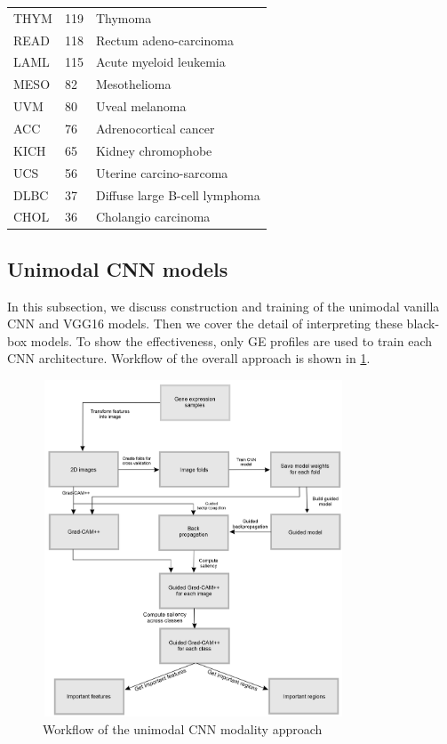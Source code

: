 \begin{table} [!ht]
\begin{center}
\begin{tabular}{l|l|l}
         THYM & 119  & Thymoma	 \\%
         READ & 118  & Rectum adeno-carcinoma \\%
         LAML & 115  & Acute myeloid leukemia	\\%
         MESO & 82  & Mesothelioma	\\%
         UVM & 80  & Uveal melanoma	 \\%
         ACC & 76  & Adrenocortical cancer	\\%
         KICH & 65  & Kidney chromophobe	\\%
         UCS & 56  & Uterine carcino-sarcoma	 \\%
         DLBC & 37  & Diffuse large B-cell lymphoma	\\%
         CHOL & 36  & Cholangio carcinoma	 \\%
         \bottomrule
    \end{tabular}
    \end{center}
\end{table}
\fi 

\subsection{Unimodal CNN models}
In this subsection, we discuss construction and training of the unimodal vanilla CNN and VGG16 models. Then we cover the detail of interpreting these black-box models. To show the effectiveness, only GE profiles are used to train each CNN architecture. Workflow of the overall approach is shown in \cref{fig:workflow_2D_CNN}.

\begin{figure}[h]
	\centering
	\includegraphics[width=0.8\textwidth,height=100mm]{images/wf_2D_CNN.png}
    \caption{Workflow of the unimodal CNN modality approach}	
	\label{fig:workflow_2D_CNN}
\end{figure}

